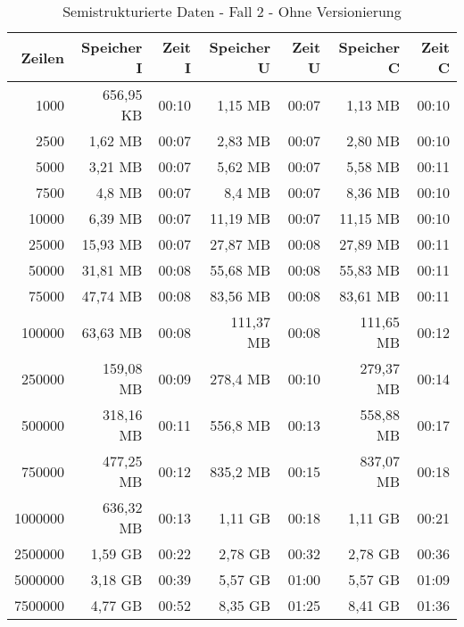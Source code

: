 
\begin{table}[h!]
    \centering
    \begin{tabular}{|r|r|r|r|r|r|r|}
        \hline
        \textbf{Zeilen} & \textbf{Speicher I} & \textbf{Zeit I} & \textbf{Speicher U} & \textbf{Zeit U} & \textbf{Speicher C} & \textbf{Zeit C} \\ \hline
        1000    & 656,95 KB & 00:10 & 1,15 MB   & 00:07 & 1,13 MB   & 00:10 \\ \hline
        2500    & 1,62 MB   & 00:07 & 2,83 MB   & 00:07 & 2,80 MB   & 00:10 \\ \hline
        5000    & 3,21 MB   & 00:07 & 5,62 MB   & 00:07 & 5,58 MB   & 00:11 \\ \hline
        7500    & 4,8 MB    & 00:07 & 8,4 MB    & 00:07 & 8,36 MB   & 00:10 \\ \hline
        10000   & 6,39 MB   & 00:07 & 11,19 MB  & 00:07 & 11,15 MB  & 00:10 \\ \hline
        25000   & 15,93 MB  & 00:07 & 27,87 MB  & 00:08 & 27,89 MB  & 00:11 \\ \hline
        50000   & 31,81 MB  & 00:08 & 55,68 MB  & 00:08 & 55,83 MB  & 00:11 \\ \hline
        75000   & 47,74 MB  & 00:08 & 83,56 MB  & 00:08 & 83,61 MB  & 00:11 \\ \hline
        100000  & 63,63 MB  & 00:08 & 111,37 MB & 00:08 & 111,65 MB & 00:12 \\ \hline
        250000  & 159,08 MB & 00:09 & 278,4 MB  & 00:10 & 279,37 MB & 00:14 \\ \hline
        500000  & 318,16 MB & 00:11 & 556,8 MB  & 00:13 & 558,88 MB & 00:17 \\ \hline
        750000  & 477,25 MB & 00:12 & 835,2 MB  & 00:15 & 837,07 MB & 00:18 \\ \hline
        1000000 & 636,32 MB & 00:13 & 1,11 GB   & 00:18 & 1,11 GB   & 00:21 \\ \hline
        2500000 & 1,59 GB   & 00:22 & 2,78 GB   & 00:32 & 2,78 GB   & 00:36 \\ \hline
        5000000 & 3,18 GB   & 00:39 & 5,57 GB   & 01:00 & 5,57 GB   & 01:09 \\ \hline
        7500000 & 4,77 GB   & 00:52 & 8,35 GB   & 01:25 & 8,41 GB   & 01:36 \\ \hline
    \end{tabular}
    \caption{Semistrukturierte Daten - Fall 2 - Ohne Versionierung}
    \label{tab:sql-80-20-40-updated}
\end{table}


